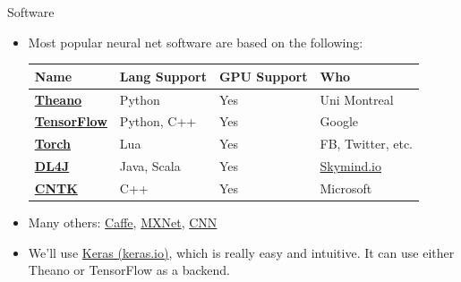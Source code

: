 \documentclass[xcolor=pdftex,x11names,table,hyperref]{beamer}
\begin{document}
\begin{frame}{Software}
\begin{itemize}
	\item Most popular neural net software are based on the following: \\[1.0em]
\hspace*{-2.0em}%
\begin{tabular}{llll}
	\bf Name & \bf Lang Support & \bf GPU Support & \bf Who \\
	\hline
	\bf \href{http://www.deeplearning.net/software/theano}{Theano} & Python & Yes & Uni Montreal \\
	\bf \href{https://www.tensorflow.org}{TensorFlow} & Python, C++ & Yes & Google \\
	\bf \href{http://torch.ch}{Torch} & Lua & Yes & FB, Twitter, etc. \\
	\bf \href{http://deeplearning4j.org}{DL4J} & Java, Scala & Yes & \href{http://skymind.io}{Skymind.io} \\
	\bf \href{https://github.com/Microsoft/CNTK}{CNTK} & C++ & Yes & Microsoft \\
\end{tabular}
\vspace*{1.0em}
\pause
\item Many others: \href{http://caffe.berkeleyvision.org}{Caffe}, \href{https://github.com/dmlc/mxnet}{MXNet}, \href{https://github.com/clab/cnn}{CNN}
\pause
\item We'll use \href{http://keras.io}{Keras (keras.io)}, which is really easy and intuitive.  It can use either Theano or TensorFlow as a backend.
\end{itemize}
\end{frame}

\end{document}
